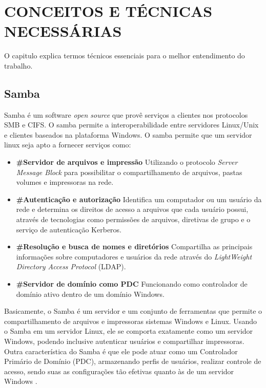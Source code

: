 \chapter{CONCEITOS E TÉCNICAS NECESSÁRIAS}

O capitulo explica termos técnicos essenciais para o melhor entendimento do trabalho.

\section{Samba}

Samba é um software \textit{open source} que provê serviços a clientes nos protocolos SMB e CIFS.
O samba permite a interoperabilidade entre servidores Linux/Unix e clientes baseados na
plataforma Windows.
O samba permite que um servidor linux seja apto a fornecer serviços como:
  \begin{itemize}
    \item \textbf{\#Servidor de arquivos e impressão} Utilizando o protocolo \textit{Server Message Block} para possibilitar o compartilhamento de arquivos, pastas volumes e impressoras na rede.

    \item \textbf{\#Autenticação e autorização} Identifica um computador ou um usuário da rede e determina os direitos de acesso a arquivos que cada usuário possui, através de tecnologias como permissões de arquivos, diretivas de grupo e o serviço de autenticação Kerberos.

    \item \textbf{\#Resolução e busca de nomes e diretórios} Compartilha as principais informações sobre computadores e usuários da rede através do \textit{LightWeight Directory Access Protocol} (LDAP).%

    \item \textbf{\#Servidor de domínio como PDC} Funcionando como controlador de domínio ativo dentro de um domínio Windows.
  \end{itemize}

Basicamente, o Samba é um servidor e um conjunto de ferramentas que permite o compartilhamento de arquivos e impressoras sistemas Windows e Linux. Usando o Samba em um servidor Linux, ele se comporta exatamente como um servidor Windows, podendo inclusive autenticar usuários e compartilhar impressoras. Outra característica do Samba é que ele pode atuar como um Controlador Primário de Domínio (PDC), armazenando perfis de usuários, realizar controle de acesso, sendo suas as configurações tão efetivas quanto às de um servidor Windows \cite{FOCA}.

